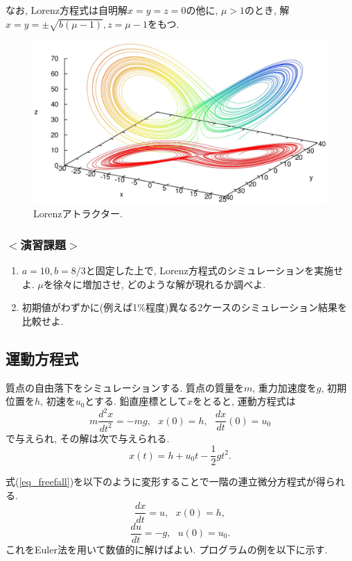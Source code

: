 \documentclass[a4j]{jsarticle}
\begin{document}
なお, Lorenz方程式は自明解$x=y=z=0$の他に, 
$\mu >1$のとき, 解$x=y=\pm \sqrt{b(\mu-1)}, z=\mu-1$をもつ. 

\begin{figure}[ht]
\centering
\includegraphics[width=0.9\linewidth]{source/figure/lorenz.eps}
\caption{Lorenzアトラクター. }
\end{figure}

\subsubsection*{$<$演習課題$>$}
\begin{enumerate}
\item $a=10, b=8/3$と固定した上で, Lorenz方程式のシミュレーションを実施せよ. 
$\mu$を徐々に増加させ, どのような解が現れるか調べよ. 
\item 初期値がわずかに(例えば1\%程度)異なる2ケースのシミュレーション結果を比較せよ. 

\end{enumerate}


\subsection{運動方程式}
質点の自由落下をシミュレーションする. 
質点の質量を$m$, 重力加速度を$g$, 初期位置を$h$, 初速を$u_0$とする. 
鉛直座標として$x$をとると, 運動方程式は
\begin{equation}
m\frac{d^2x}{dt^2}=-mg, \ \ \ x(0)=h, \ \ \ \frac{dx}{dt}(0)=u_0
\label{eq_freefall}
\end{equation}
で与えられ, その解は次で与えられる. 
\begin{equation}
x(t)=h+u_0t-\frac{1}{2}gt^2. 
\end{equation}

式(\ref{eq_freefall})を以下のように変形することで一階の連立微分方程式が得られる. 
\begin{equation}
\frac{dx}{dt}=u, \ \ \ x(0)=h, 
\end{equation}
\begin{equation}
\frac{du}{dt}=-g, \ \ \ u(0)=u_0. 
\end{equation}
これをEuler法を用いて数値的に解けばよい. 
プログラムの例を以下に示す. 

\end{document}
